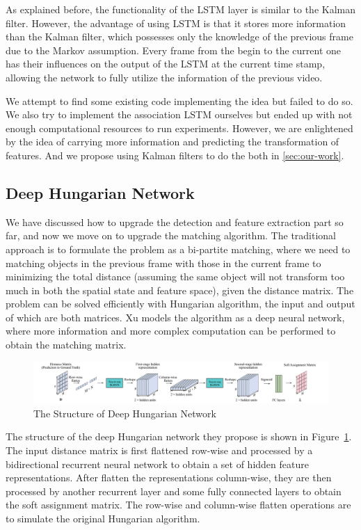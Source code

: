 \documentclass[conference]{IEEEtran}
\begin{document}
As explained before, the functionality of the LSTM layer is similar to the Kalman filter.
However, the advantage of using LSTM is that it stores more information than the Kalman filter, which possesses only the knowledge of the previous frame due to the Markov assumption.
Every frame from the begin to the current one has their influences on the output of the LSTM at the current time stamp, allowing the network to fully utilize the information of the previous video.

We attempt to find some existing code implementing the idea but failed to do so.
We also try to implement the association LSTM ourselves but ended up with not enough computational resources to run experiments.
However, we are enlightened by the idea of carrying more information and predicting the transformation of features.
And we propose using Kalman filters to do the both in \cref{sec:our-work}.

\subsection{Deep Hungarian Network}
We have discussed how to upgrade the detection and feature extraction part so far, and now we move on to upgrade the matching algorithm.
The traditional approach is to formulate the problem as a bi-partite matching, where we need to matching objects in the previous frame with those in the current frame to minimizing the total distance (assuming the same object will not transform too much in both the spatial state and feature space), given the distance matrix.
The problem can be solved efficiently with Hungarian algorithm, the input and output of which are both matrices.
Xu \cite{xu2019deepmot} models the algorithm as a deep neural network, where more information and more complex computation can be performed to obtain the matching matrix.

\begin{figure}
    \centering
    \includegraphics[width=\linewidth]{fig/dhn.png}
    \caption{The Structure of Deep Hungarian Network\protect\footnotemark}
    \label{fig:dhn-struct}
\end{figure}

The structure of the deep Hungarian network they propose is shown in Figure~\ref{fig:dhn-struct}.
The input distance matrix is first flattened row-wise and processed by a bidirectional recurrent neural network to obtain a set of hidden feature representations.
After flatten the representations column-wise, they are then processed by another recurrent layer and some fully connected layers to obtain the soft assignment matrix.
The row-wise and column-wise flatten operations are to simulate the original Hungarian algorithm.
\end{document}

